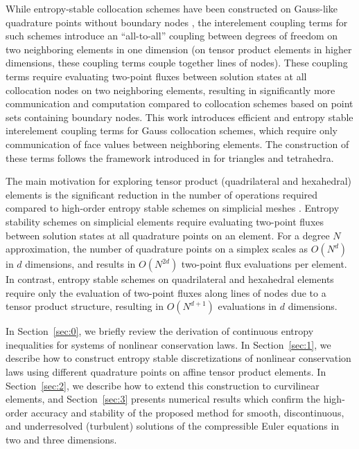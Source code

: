 \documentclass[review,onefignum,onetabnum,final]{siamart171218}
\begin{document}
While entropy-stable collocation schemes have been constructed on Gauss-like quadrature points without boundary nodes \cite{crean2017high}, the interelement coupling terms for such schemes introduce an ``all-to-all'' coupling between degrees of freedom on two neighboring elements in one dimension (on tensor product elements in higher dimensions, these coupling terms couple together lines of nodes).  These coupling terms require evaluating two-point fluxes between solution states at all collocation nodes on two neighboring elements, resulting in significantly more communication and computation compared to collocation schemes based on point sets containing boundary nodes.  This work introduces efficient and entropy stable interelement coupling terms for Gauss collocation schemes, which require only communication of face values between neighboring elements.  The construction of these terms follows the framework introduced in \cite{chan2017discretely, chan2018discretely} for triangles and tetrahedra.  

The main motivation for exploring tensor product (quadrilateral and hexahedral) elements is the significant reduction in the number of operations required compared to high-order entropy stable schemes on simplicial meshes \cite{chan2017discretely, chan2018discretely}.  Entropy stability schemes on simplicial elements require evaluating two-point fluxes between solution states at all quadrature points on an element.  For a degree $N$ approximation, the number of quadrature points on a simplex scales as $O(N^d)$ in $d$ dimensions, and results in $O(N^{2d})$ two-point flux evaluations per element.  In contrast, entropy stable schemes on quadrilateral and hexahedral elements require only the evaluation of two-point fluxes along lines of nodes due to a tensor product structure, resulting in $O(N^{d+1})$ evaluations in $d$ dimensions.  

In Section~\ref{sec:0}, we briefly review the derivation of continuous entropy inequalities for systems of nonlinear conservation laws.  In Section~\ref{sec:1}, we describe how to construct entropy stable discretizations of nonlinear conservation laws using different quadrature points on affine tensor product elements.  In Section~\ref{sec:2}, we describe how to extend this construction to curvilinear elements, and Section~\ref{sec:3} presents numerical results which confirm the high-order accuracy and stability of the proposed method for smooth, discontinuous, and underresolved (turbulent) solutions of the compressible Euler equations in two and three dimensions.  
\end{document}
